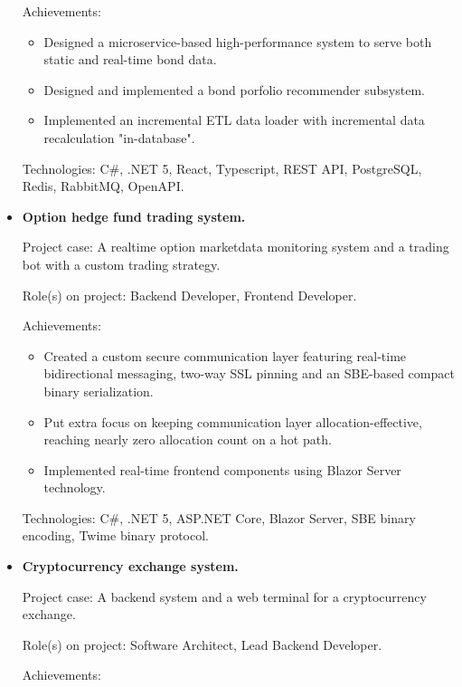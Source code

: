 \documentclass{article}
\begin{document}
\begin{itemize}
{        Achievements:
        
            \begin{itemize}
                \item Designed a microservice-based high-performance system to serve both static and real-time bond data.
                \item Designed and implemented a bond porfolio recommender subsystem.
                \item Implemented an incremental ETL data loader with incremental data recalculation "in-database".
            \end{itemize}
        
        Technologies: C\#, .NET 5, React, Typescript, REST API, PostgreSQL, Redis, RabbitMQ, OpenAPI.
    }
    \item {
        \textbf{Option hedge fund trading system.}
        
        Project case: A realtime option marketdata monitoring system and a trading bot with a custom trading strategy.
        
        Role(s) on project: Backend Developer, Frontend Developer.
        
        Achievements:
        
            \begin{itemize}
                \item  Created a custom secure communication layer featuring real-time bidirectional messaging, two-way SSL pinning and an SBE-based compact binary serialization.
                \item Put extra focus on keeping communication layer allocation-effective, reaching nearly zero allocation count on a hot path.
                \item Implemented real-time frontend components using Blazor Server technology.
            \end{itemize}
        
        Technologies: C\#, .NET 5, ASP.NET Core, Blazor Server, SBE binary encoding, Twime binary protocol.
    }
    \item {
        \textbf{Cryptocurrency exchange system.}
        
        Project case: A backend system and a web terminal for a cryptocurrency exchange.
        
        Role(s) on project: Software Architect, Lead Backend Developer.
        
        Achievements:
        
}
\end{itemize}
\end{document}
